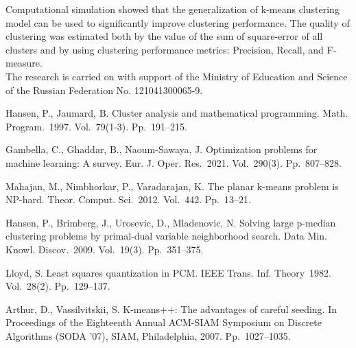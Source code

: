 \documentclass[12pt]{llncs}
\begin{document}
Computational simulation showed that the generalization of k-means clustering model can be used to significantly improve clustering performance.  The quality of clustering was estimated both by the value of the sum of square-error of all clusters  and by using clustering performance metrics: Precision, Recall, and F-measure.\\



The research is carried on with support of  the Ministry of Education and Science of the Russian Federation No. 121041300065-9.

\begin{thebibliography}{9} %

Hansen, P., Jaumard, B. Cluster analysis and mathematical programming. Math.
Program.~1997. Vol.~79(1-3). Pp.~191--215.

Gambella, C., Ghaddar, B., Naoum-Sawaya, J. Optimization problems for
machine learning: A survey. Eur. J. Oper. Res.~2021. Vol.~290(3). Pp.~807--828.

Mahajan, M., Nimbhorkar, P., Varadarajan, K. The planar k-means
problem is NP-hard. Theor. Comput. Sci.~2012.  Vol.~442. Pp.~13--21.



 

Hansen, P., Brimberg, J., Urosevic, D., Mladenovic, N. Solving large p-median
clustering problems by primal-dual variable neighborhood search. Data Min.
Knowl. Discov.~2009. Vol.~19(3). Pp.~351--375.

 Lloyd, S. Least squares quantization in PCM. IEEE Trans. Inf. Theory~1982. Vol.~28(2). Pp.~129--137.

 Arthur, D., Vassilvitskii, S. K-means++: The advantages of careful seeding. In Proceedings of the Eighteenth Annual ACM-SIAM Symposium on Discrete Algorithms (SODA '07), SIAM, Philadelphia, 2007. Pp.~1027--1035.
\end{thebibliography}

\end{document}
